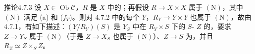 \begin{SGAresult}{推论}{4.7.3}
设 $X\in\operatorname{Ob}\mathcal C$，$R$ 是 $X$ 中的；再假设 $R\to X\times X$ 属于 $(\mathrm N)$，其中 $(\mathrm N)$ 满足 (a) 和 ($f_T$)。则对 4.7.2 中的每个 $Y$，$R_Y\to Y\times Y$ 也属于 $(\mathrm N)$，故由 4.7.1，有如下描述：$(Y/R_Y)(S)$ 是 $Y_S$ 中在 $R_Y\times S$ 下的 $S$- $Z$ 的，要求 $Z\to Y_S$ 属于 $(\mathrm N)$（于是 $Z\to X_S$ 也属于 $(\mathrm N)$）、$Z\to S$ 为，并且 $R_Z\simeq Z\times_S Z$。
\end{SGAresult}
